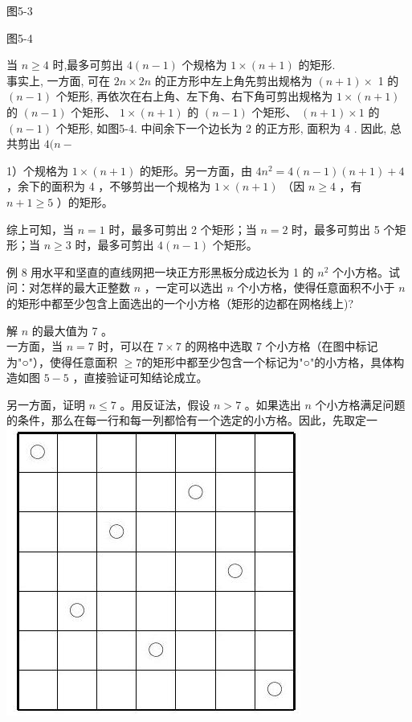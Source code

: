 \documentclass[10pt]{article}
\begin{document}
图5-3

图5-4

当 $n \geqslant 4$ 时,最多可剪出 $4(n-1)$ 个规格为 $1 \times(n+1)$ 的矩形.\\
事实上, 一方面, 可在 $2 n \times 2 n$ 的正方形中左上角先剪出规格为 $(n+1) \times$ 1 的 $(n-1)$ 个矩形, 再依次在右上角、左下角、右下角可剪出规格为 $1 \times(n+1)$的 $(n-1)$ 个矩形、 $1 \times(n+1)$ 的 $(n-1)$ 个矩形、 $(n+1) \times 1$ 的 $(n-1)$ 个矩形, 如图5-4. 中间余下一个边长为 2 的正方形, 面积为 4 . 因此, 总共剪出 $4(n-$

1）个规格为 $1 \times(n+1)$ 的矩形。另一方面，由 $4 n^{2}=4(n-1)(n+1)+4$ ，余下的面积为 4 ，不够剪出一个规格为 $1 \times(n+1)$ （因 $n \geqslant 4$ ，有 $n+1 \geqslant 5$ ）的矩形。

综上可知，当 $n=1$ 时，最多可剪出 2 个矩形；当 $n=2$ 时，最多可剪出 5 个矩形；当 $n \geqslant 3$ 时，最多可剪出 $4(n-1)$ 个矩形。

例 8 用水平和坚直的直线网把一块正方形黑板分成边长为 1 的 $n^{2}$ 个小方格。试问：对怎样的最大正整数 $n$ ，一定可以选出 $n$ 个小方格，使得任意面积不小于 $n$ 的矩形中都至少包含上面选出的一个小方格（矩形的边都在网格线上)?

解 $n$ 的最大值为 7 。\\
一方面，当 $n=7$ 时，可以在 $7 \times 7$ 的网格中选取 7 个小方格（在图中标记为"○"），使得任意面积 $\geqslant 7$的矩形中都至少包含一个标记为"○"的小方格，具体构造如图 $5-5$ ，直接验证可知结论成立。

另一方面，证明 $n \leqslant 7$ 。用反证法，假设 $n>7$ 。如果选出 $n$ 个小方格满足问题的条件，那么在每一行和每一列都恰有一个选定的小方格。因此，先取定一\\
\includegraphics[max width=\textwidth, center]{2024_10_09_bce9f07034ef55fc9c97g-59}
\end{document}

